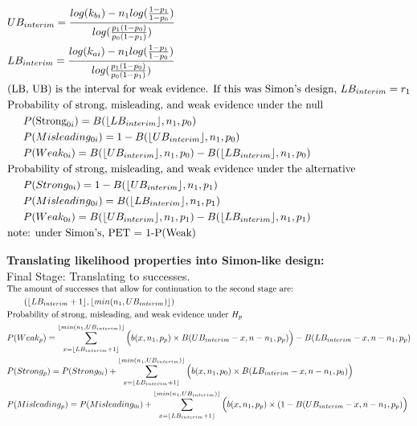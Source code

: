 \documentclass[12pt]{report}\usepackage[]{graphicx}\usepackage[]{color}
\DeclarePairedDelimiter\floor{\lfloor}{\rfloor}
\newlength{\li}\setlength{\li}{14.48pt}
\newlength{\di}\setlength{\di}{-3.5mm}
\begin{document}
$\begin{aligned}
  & UB_{interim} = \frac{log(k_{bi}) - n_1 log(\frac{1-p_1}{1-p_0})}{log(\frac{p_1(1-p_0)}{p_0(1-p_1)})} \\
  & LB_{interim} = \frac{log(k_{ai}) - n_1 log(\frac{1-p_1}{1-p_0})}{log(\frac{p_1(1-p_0)}{p_0(1-p_1)})} \\
  &\text{(LB, UB) is the interval for weak evidence. If this was Simon's design, } LB_{interim} = r_1 \\
  &\text{Probability of strong, misleading, and weak evidence under the null} \\
  &\indent P(\mbox{Strong}_{0i}) = B(\floor*{LB_{interim}}, n_1, p_0) \\
  &\indent P(Misleading_{0i}) = 1-B(\floor*{UB_{interim}}, n_1, p_0) \\
  &\indent P(Weak_{0i}) = B(\floor*{UB_{interim}}, n_1, p_0) - B(\floor*{LB_{interim}}, n_1, p_0)\\
  &\text{Probability of strong, misleading, and weak evidence under the alternative} \\
  &\indent P(Strong_{0i}) = 1-B(\floor*{UB_{interim}}, n_1, p_1) \\
  &\indent P(Misleading_{0i}) = B(\floor*{LB_{interim}}, n_1, p_1) \\
  &\indent P(Weak_{0i}) = B(\floor*{UB_{interim}}, n_1, p_1) - B(\floor*{LB_{interim}}, n_1, p_1) \\
  &\text{note: under Simon's, PET = 1-P(Weak)}
\end{aligned}$

\newpage 
\vspace{5mm}
\noindent \textbf{Translating likelihood properties into Simon-like design:} \\
Final Stage: Translating to successes.\\
$\begin{aligned}
  & \text{The amount of successes that allow for continuation to the second stage are:  }  \\                   
  & \qquad  (\floor*{LB_{interim}+1}, \floor*{min(n_1, UB_{interim})}) \\
  &\text{Probability of strong, misleading, and weak evidence under } H_p \\
  & P(Weak_p) = \sum_{x=\floor*{LB_{interim}+1}}^{\floor*{min(n_1, UB_{interim})}} \Big(b(x, n_1, p_p) \times B(UB_{interim} - x, n - n_1, p_p)\Big) - B(LB_{interim} - x, n - n_1, p_p)\\
  & P(Strong_p) = P(Strong_{0i}) + \sum_{x=\floor*{LB_{interim}+1}}^{\floor*{min(n_1, UB_{interim})}} \Big( b(x,n_1,p_0) \times B(LB_{interim} - x, n-n_1, p_0) \Big) \\
  & P(Misleading_p) = P(Misleading_{0i}) + \sum_{x=\floor*{LB_{interim}+1}}^{\floor*{min(n_1, UB_{interim})}} \Big(b(x, n_1, p_p) \times (1-B(UB_{interim} - x, n-n_1, p_p) \Big)
\end{aligned}$
\end{document}
